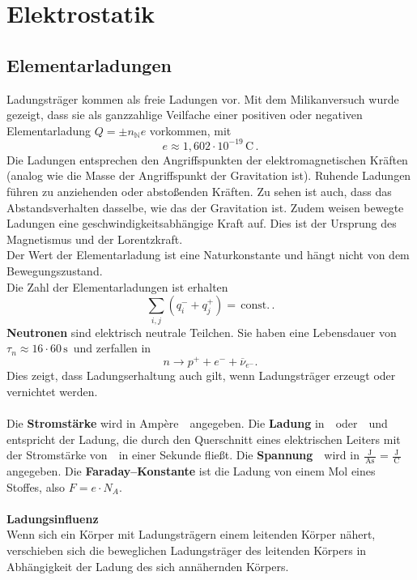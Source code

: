 

\section{Elektrostatik}
\subsection{Elementarladungen}
Ladungsträger kommen als freie Ladungen vor. Mit dem Milikanversuch wurde gezeigt, dass sie als ganzzahlige Veilfache einer positiven oder negativen Elementarladung $Q=\pm n_\mathbb{N} e$ vorkommen, mit
\[ 
        e\approx 1,602\cdot 10^{-19}\,\text{C}\,
.\] 
Die Ladungen entsprechen den Angriffspunkten der elektromagnetischen Kräften (analog wie die Masse der Angriffspunkt der Gravitation ist). Ruhende Ladungen führen zu anziehenden oder abstoßenden Kräften. Zu sehen ist auch, dass das Abstandsverhalten dasselbe, wie das der Gravitation ist. Zudem weisen bewegte Ladungen eine geschwindigkeitsabhängige Kraft auf. Dies ist der Ursprung des Magnetismus und der Lorentzkraft.\\\indent
Der Wert der Elementarladung ist eine Naturkonstante und hängt nicht von dem Bewegungszustand.\\\indent
Die Zahl der Elementarladungen ist erhalten
\[ 
        \sum_{i,j}^{}\left(q^-_i+q^+_j\right)=\,\text{const.}\,
.\] 
\textbf{Neutronen} sind elektrisch neutrale Teilchen. Sie haben eine Lebensdauer von $\tau _n\approx 16\cdot 60\,\text{s}\,$ und zerfallen in
\[ 
        n\rightarrow p^++e^-+\overline{\nu }_{e^-}
.\] 
Dies zeigt, dass Ladungserhaltung auch gilt, wenn Ladungsträger erzeugt oder vernichtet werden.\\\\\indent
Die \textbf{Stromstärke} wird in Amp\`ere \,\, angegeben. Die \textbf{Ladung} in \,\, oder \,\, und entspricht der Ladung, die durch den Querschnitt eines elektrischen Leiters mit der Stromstärke von \,\, in einer Sekunde fließt. Die \textbf{Spannung} \,\, wird in $\tfrac{\,\text{J}\,}{\,\text{As}\,}=\tfrac{\,\text{J}\,}{\,\text{C}\,}$ angegeben. Die \textbf{Faraday--Konstante} ist die Ladung von einem Mol eines Stoffes, also $F=e\cdot N_A$.  
\\\hfill\\\textbf{Ladungsinfluenz}\\ 
Wenn sich ein Körper mit Ladungsträgern einem leitenden Körper nähert, verschieben sich die beweglichen Ladungsträger des leitenden Körpers in Abhängigkeit der Ladung des sich annähernden Körpers.

